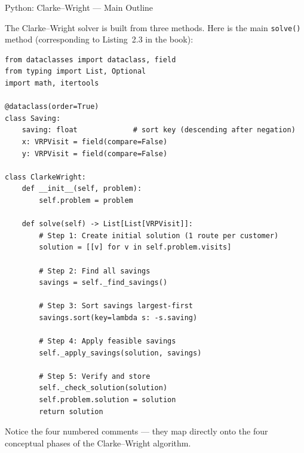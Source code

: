 \documentclass[aspectratio=169,10pt]{beamer}
\begin{document}
\begin{frame}[fragile]{Python: Clarke--Wright --- Main Outline}

  The Clarke--Wright solver is built from three methods.  Here is the main
  \texttt{solve()} method (corresponding to Listing~2.3 in the book):

\begin{lstlisting}[caption={Clarke--Wright main \texttt{solve()} method}]
from dataclasses import dataclass, field
from typing import List, Optional
import math, itertools

@dataclass(order=True)
class Saving:
    saving: float             # sort key (descending after negation)
    x: VRPVisit = field(compare=False)
    y: VRPVisit = field(compare=False)

class ClarkeWright:
    def __init__(self, problem):
        self.problem = problem

    def solve(self) -> List[List[VRPVisit]]:
        # Step 1: Create initial solution (1 route per customer)
        solution = [[v] for v in self.problem.visits]

        # Step 2: Find all savings
        savings = self._find_savings()

        # Step 3: Sort savings largest-first
        savings.sort(key=lambda s: -s.saving)

        # Step 4: Apply feasible savings
        self._apply_savings(solution, savings)

        # Step 5: Verify and store
        self._check_solution(solution)
        self.problem.solution = solution
        return solution
\end{lstlisting}

  Notice the four numbered comments --- they map directly onto the four
  conceptual phases of the Clarke--Wright algorithm.

\end{frame}
\end{document}
